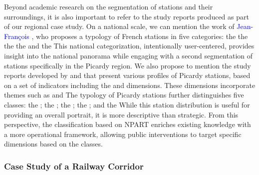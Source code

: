 \begin{refsegment}
Beyond academic research on the segmentation of stations and their surroundings, it is also important to refer to the study reports produced as part of our regional case study. On a national scale, we can mention the work of \textcolor{blue}{Jean-François} \textcolor{blue}{\textcite[98-104]{troin_essai_2024}}, who proposes a typology of French stations in five categories: the  the  the  the  and the  This national categorization, intentionally user-centered, provides insight into the national panorama while engaging with a second segmentation of stations specifically in the Picardy region. We also propose to mention the study reports developed by \textcolor{blue}{\textcite[50-57]{hasiak_pour_2011}} and \textcolor{blue}{\textcite[6]{cete_nord_picardie_profils_2011}} that present various profiles of Picardy stations, based on a set of indicators including the  and  dimensions. These dimensions incorporate themes such as    and  The typology of Picardy stations further distinguishes five classes: the ; the ; the ; the ; and the  While this station distribution is useful for providing an overall portrait, it is more descriptive than strategic. From this perspective, the classification based on \acrshort{NPART} enriches existing knowledge with a more operational framework, allowing public interventions to target specific dimensions based on the classes.%

\subsubsection*{Case Study of a Railway Corridor
    \label{chap6:results-etudes-de-cas}
    }


\end{refsegment}
